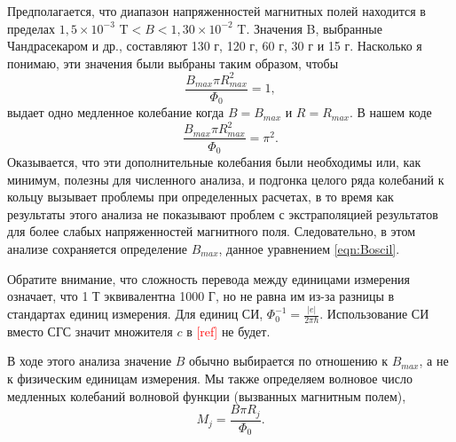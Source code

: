 \documentclass[A4,12pt,oneside]{article}
\renewcommand{\(}{\left(}
\renewcommand{\)}{\right)}
\newcommand{\nprog}{\color{green!50!black}}
\newcommand{\citeph}{\textcolor{red}{[ref] }}
\begin{document}
{\nprog 
Предполагается, что диапазон напряженностей магнитных полей находится в пределах
$1,5 \times 10^{-3}$ T$ < B < 1,30 \times 10^{-2}$ T. Значения B, выбранные Чандрасекаром и др., составляют 130 г, 120 г, 60 г, 30 г и 15 г. Насколько я понимаю, эти значения были выбраны таким образом, чтобы
\begin{equation}
\frac{B_{max}\pi R^2_{max}}{\Phi_0} = 1,
\end{equation}
выдает одно медленное колебание когда $B = B_{max}$ и $R = R_{max}$. В нашем коде
\begin{equation}\label{eqn:Boscil}
\frac{B_{max}\pi R^2_{max}}{\Phi_0} = \pi^2.
\end{equation}
Оказывается, что эти дополнительные колебания были необходимы или, как минимум, полезны для численного анализа, и подгонка целого ряда колебаний к кольцу вызывает проблемы при определенных расчетах, в то время как результаты этого анализа не показывают проблем с экстраполяцией результатов для более слабых напряженностей магнитного поля. Следовательно, в этом анализе сохраняется определение $B_{max}$, данное уравнением \ref{eqn:Boscil}.

Обратите внимание, что сложность перевода между единицами измерения означает, что 1 Т эквивалентна 1000 Г, но не равна им из-за разницы в стандартах единиц измерения. Для единиц СИ,
$\Phi_0^{-1}=\frac{\left|e\right|}{2 \pi \hbar}$. Использование СИ вместо СГС значит множителя $c$ в \citeph не будет.

В ходе этого анализа значение $B$ обычно выбирается по отношению к $B_{max}$, а не к физическим единицам измерения. Мы также определяем волновое число
медленных колебаний волновой функции (вызванных магнитным полем),
\begin{equation}
M_j = \frac{B\pi R_j}{\Phi_0}.
\end{equation}
}
\end{document}
